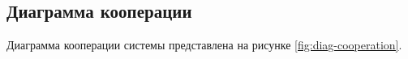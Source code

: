 \subsection{Диаграмма кооперации}
Диаграмма кооперации системы представлена на рисунке \ref{fig:diag-cooperation}.
